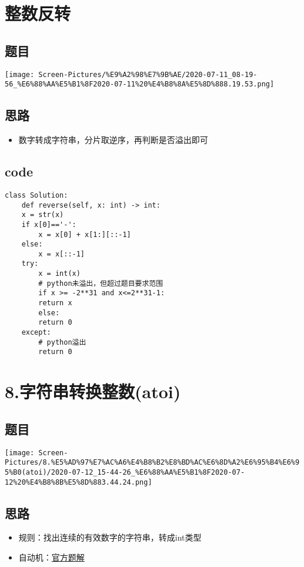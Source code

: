 \documentclass[11pt]{article}
\author{blacktear}
\date{\today}
\title{}
\begin{document}
\tableofcontents

\section{整数反转}
\label{sec:orgc8f79d5}
\subsection{题目}
\label{sec:org6579f53}
\begin{center}
\texttt{[image: Screen-Pictures/\%E9\%A2\%98\%E7\%9B\%AE/2020-07-11\_08-19-56\_\%E6\%88\%AA\%E5\%B1\%8F2020-07-11\%20\%E4\%B8\%8A\%E5\%8D\%888.19.53.png]}
\end{center}
\subsection{思路}
\label{sec:org42b3dbb}
\begin{itemize}
\item 数字转成字符串，分片取逆序，再判断是否溢出即可
\end{itemize}
\subsection{code}
\label{sec:org398fa22}
\begin{verbatim}
class Solution:
    def reverse(self, x: int) -> int:
	x = str(x)
	if x[0]=='-':
	    x = x[0] + x[1:][::-1]
	else:
	    x = x[::-1]
	try:
	    x = int(x)
	    # python未溢出，但超过题目要求范围
	    if x >= -2**31 and x<=2**31-1:
		return x
	    else:
		return 0
	except:
	    # python溢出
	    return 0
\end{verbatim}
\section{8.字符串转换整数(atoi)}
\label{sec:orgdd0292c}
\subsection{题目}
\label{sec:org5532c5c}
\begin{center}
\texttt{[image: Screen-Pictures/8.\%E5\%AD\%97\%E7\%AC\%A6\%E4\%B8\%B2\%E8\%BD\%AC\%E6\%8D\%A2\%E6\%95\%B4\%E6\%95\%B0(atoi)/2020-07-12\_15-44-26\_\%E6\%88\%AA\%E5\%B1\%8F2020-07-12\%20\%E4\%B8\%8B\%E5\%8D\%883.44.24.png]}
\end{center}
\subsection{思路}
\label{sec:orgd36b6f7}
\begin{itemize}
\item 规则：找出连续的有效数字的字符串，转成int类型
\item 自动机：\href{https://leetcode-cn.com/problems/string-to-integer-atoi/solution/zi-fu-chuan-zhuan-huan-zheng-shu-atoi-by-leetcode-/}{官方题解}
\end{itemize}
\end{document}
